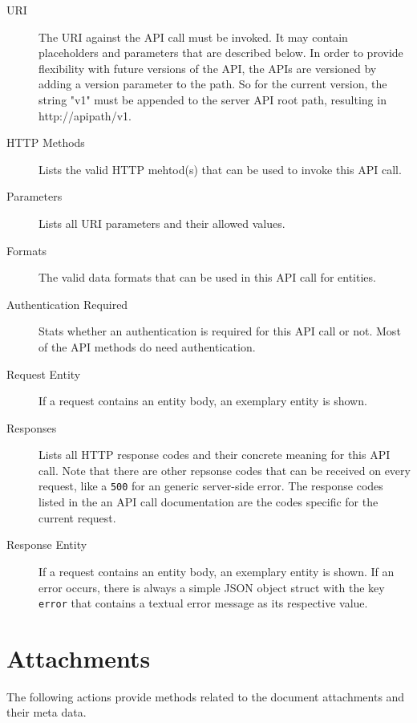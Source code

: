 \documentclass[10pt]{article}
\begin{document}
\begin{description}

	\item[URI] The URI against the API call must be invoked. It may contain placeholders and parameters that are described below. In order to provide flexibility with future versions of the API, the APIs are versioned by adding a version parameter to the path. So for the current version, the string "v1" must be appended to the server API root path, resulting in http://apipath/v1. 

	\item[HTTP Methods] Lists the valid HTTP mehtod(s) that can be used to invoke this API call.

	\item[Parameters] Lists all URI parameters and their allowed values. 

	\item[Formats] The valid data formats that can be used in this API call for entities.

	\item[Authentication Required] Stats whether an authentication is required for this API call or not. Most of the API methods do need authentication.

	\item[Request Entity] If a request contains an entity body, an exemplary entity is shown.

	\item[Responses] Lists all HTTP response codes and their concrete meaning for this API call. Note that there are other repsonse codes that can be received on every request, like a \texttt{500} for an generic server-side error. The response codes listed in the an API call documentation are the codes specific for the current request.

	\item[Response Entity]  If a request contains an entity body, an exemplary entity is shown. If an error occurs, there is always a simple JSON object struct with the key \texttt{error} that contains a textual error message as its respective value.

\end{description}

\section{Attachments}
The following actions provide methods related to the document attachments and their meta data.
\end{document}
